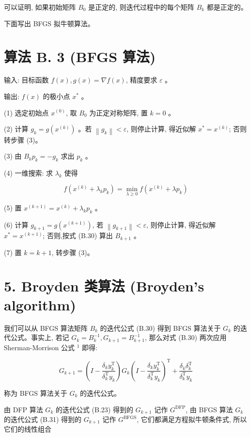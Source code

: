 \documentclass[10pt]{article}
\begin{document}
可以证明, 如果初始矩阵 $B_{0}$ 是正定的, 则迭代过程中的每个矩阵 $B_{k}$ 都是正定的。

下面写出 BFGS 拟牛顿算法。

\section*{算法 B. 3 (BFGS 算法)}
输入: 目标函数 $f(x), g(x)=\nabla f(x)$, 精度要求 $\varepsilon$ 。

输出: $f(x)$ 的极小点 $x^{*}$ 。

(1) 选定初始点 $x^{(0)}$, 取 $B_{0}$ 为正定对称矩阵, 置 $k=0$ 。

(2) 计算 $g_{k}=g\left(x^{(k)}\right)$ 。若 $\left\|g_{k}\right\|<\varepsilon$, 则停止计算, 得近似解 $x^{*}=x^{(k)}$; 否则转步骤 (3)。

(3) 由 $B_{k} p_{k}=-g_{k}$ 求出 $p_{k}$ 。

(4) 一维搜索: 求 $\lambda_{k}$ 使得

$$
f\left(x^{(k)}+\lambda_{k} p_{k}\right)=\min _{\lambda \geqslant 0} f\left(x^{(k)}+\lambda p_{k}\right)
$$

(5) 置 $x^{(k+1)}=x^{(k)}+\lambda_{k} p_{k}$ 。

(6) 计算 $g_{k+1}=g\left(x^{(k+1)}\right)$, 若 $\left\|g_{k+1}\right\|<\varepsilon$, 则停止计算, 得近似解 $x^{*}=x^{(k+1)}$; 否则,按式 (B.30) 算出 $B_{k+1}$ 。

(7) 置 $k=k+1$, 转步骤 (3)。

\section*{5. Broyden 类算法 (Broyden’s algorithm)}
我们可以从 BFGS 算法矩阵 $B_{k}$ 的迭代公式 (B.30) 得到 BFGS 算法关于 $G_{k}$ 的迭代公式。事实上, 若记 $G_{k}=B_{k}^{-1}, G_{k+1}=B_{k+1}^{-1}$, 那么对式 (B.30) 两次应用 Sherman-Morrison 公式 ${ }^{1}$ 即得:


\begin{equation*}
G_{k+1}=\left(I-\frac{\delta_{k} y_{k}^{\mathrm{T}}}{\delta_{k}^{\mathrm{T}} y_{k}}\right) G_{k}\left(I-\frac{\delta_{k} y_{k}^{\mathrm{T}}}{\delta_{k}^{\mathrm{T}} y_{k}}\right)^{\mathrm{T}}+\frac{\delta_{k} \delta_{k}^{\mathrm{T}}}{\delta_{k}^{\mathrm{T}} y_{k}} \tag{B.31}
\end{equation*}


称为 BFGS 算法关于 $G_{k}$ 的迭代公式。

由 DFP 算法 $G_{k}$ 的迭代公式 (B.23) 得到的 $G_{k+1}$ 记作 $G^{\mathrm{DFP}}$, 由 BFGS 算法 $G_{k}$ 的迭代公式 (B.31) 得到的 $G_{k+1}$ 记作 $G^{\mathrm{BFGS}}$, 它们都满足方程拟牛顿条件式, 所以它们的线性组合
\end{document}

